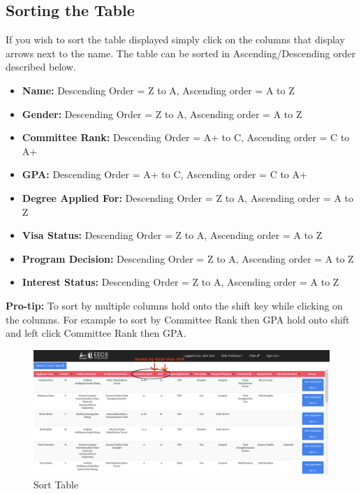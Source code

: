 \documentclass[fontsize=12pt,paper=letter,twoside]{scrartcl}
\begin{document}
\subsection{Sorting the Table}
If you wish to sort the table displayed simply click on the columns that display arrows next to the name. The table can be sorted in Ascending/Descending order described below.
\begin{itemize}
\item \textbf{Name:} Descending Order = Z to A, Ascending order = A to Z
\item \textbf{Gender:} Descending Order = Z to A, Ascending order = A to Z
\item \textbf{Committee Rank:} Descending Order = A+ to C, Ascending order = C to A+
\item \textbf{GPA:} Descending Order = A+ to C, Ascending order = C to A+
\item \textbf{Degree Applied For:} Descending Order = Z to A, Ascending order = A to Z
\item \textbf{Visa Status:} Descending Order = Z to A, Ascending order = A to Z
\item \textbf{Program Decision:} Descending Order = Z to A, Ascending order = A to Z
\item \textbf{Interest Status:} Descending Order = Z to A, Ascending order = A to Z
\end{itemize}
\textbf{Pro-tip:} To sort by multiple columns hold onto the shift key while clicking on the columns. For example to sort by Committee Rank then GPA hold onto shift and left click Committee Rank then GPA.
\begin{figure}[!htb]
\begin{center}
\includegraphics[width=.99\textwidth]{images/sorted_table.png}
\end{center}
\caption{Sort Table}
\label{fig:sorted_table}
\end{figure}
\clearpage
\end{document}
